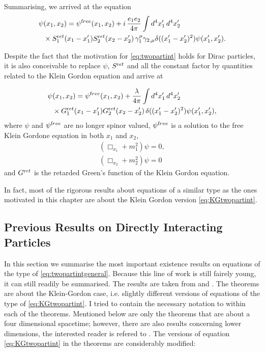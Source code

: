 \documentclass[b5paper,draft,openbib,12pt]{memoir}
\newcommand{\ret}{{\textup ret}}
\newcommand{\free}{{\textup free}}
\begin{document}
Summarising, we arrived at the equation
\begin{align}\label{eq:twopartint}
  \psi&(x_1,x_2) = \psi^\free(x_1,x_2)+i\, \frac{e_1e_2}{4\pi} \int d^4 x_1' \, d^4 x_2' \\\nonumber
  & \times S^\ret_1(x_1-x_1') S^\ret_2(x_2-x_2') \, \gamma_1^\mu \gamma_{2,\mu}\delta((x_1'-x_2')^2) \psi(x_1',x_2').
\end{align}


Despite the fact that the motivation for \eqref{eq:twopartint} holds for Dirac particles, 
it is also conceivable to replace \(\psi\), \(S^\ret\) and all the constant factor by 
quantities related to the Klein Gordon equation and arrive at 

\begin{align}\label{eq:KGtwopartint}
  \psi&(x_1,x_2) = \psi^\free(x_1,x_2)+\frac{\lambda}{4\pi} \int d^4 x_1' \, d^4 x_2' \\\nonumber
  & \times G^\ret_1(x_1-x_1') G^\ret_2(x_2-x_2') \,\delta((x_1'-x_2')^2) \psi(x_1',x_2'),
\end{align}
where \(\psi\) and \(\psi^\free\) are no longer spinor valued, \(\psi^\free\) is a
solution to the free Klein Gordone equation in both \(x_1\) and \(x_2\),
\begin{align}
  (\Box_{x_1} + m_1^2)\psi=0,\\
  (\Box_{x_2} + m_2^2)\psi=0
\end{align}
and \(G^\ret\) is the retarded Green's function of the Klein Gordon equation.

In fact,  most of the rigorous results about equations of a similar 
type as the ones motivated in this chapter are about the Klein 
Gordon version \eqref{eq:KGtwopartint}.



\subsection{Previous Results on Directly Interacting Particles}\label{sec: direct interation previous}
In this section we summarise the most important existence results 
on equations of the type of 
\eqref{eq:twopartintgeneral}. Because this line of work is still 
fairely young,
it can still readily be summarised. The results are taken 
from \cite{direct_interaction_quantum} and 
\cite{lienertcurved}. The theorems are about the Klein-Gordon case, i.e.
slightly different versions of equations
of the type of \eqref{eq:KGtwopartint}. I tried to contain the 
necessary notation to within each
of the theorems. Mentioned below are only the theorems that are about a 
four dimensional spacetime; however,  
there are also results concerning lower dimensions, 
the interested reader 
is refered to \cite{direct_interaction_quantum,lienertcurved}. The versions of 
equation \eqref{eq:KGtwopartint} in the theorems are 
considerably modified:
\end{document}
